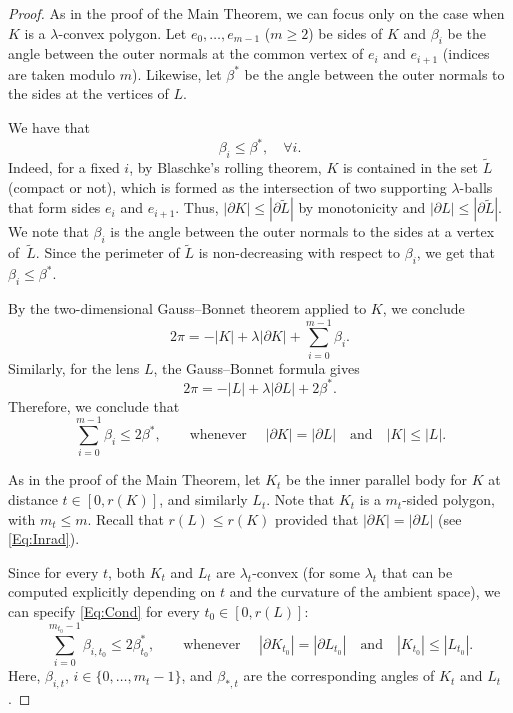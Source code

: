 \documentclass[10pt,a4paper]{amsart}
\renewcommand{\ge}{\geqslant}
\renewcommand{\le}{\leqslant}
\renewcommand{\tilde}{\widetilde}
\begin{document}
\begin{proof}
    As in the proof of the Main Theorem, we can focus only on the case when $K$ is a $\lambda$-convex polygon. Let $e_0, \ldots, e_{m-1}$ ($m \ge 2$) be sides of $K$ and $\beta_i$ be the angle between the outer normals at the common vertex of $e_i$ and $e_{i+1}$ (indices are taken modulo $m$).    
    Likewise, let $\beta^*$ be the angle between the outer normals to the sides at the vertices of $L$. 

   We have that 
    \begin{equation}
        \label{Eq:Angles}
        \beta_i \le \beta^*, \quad \forall i.
    \end{equation}
    Indeed, for a fixed $i$, by Blaschke's rolling theorem, $K$ is contained in the set $\tilde{L}$ (compact or not), which is formed as the intersection of two supporting $\lambda$-balls that form sides $e_i$ and $e_{i+1}$. Thus, $|\partial K| \le |\partial \tilde{L}|$ by monotonicity and $|\partial L| \le |\partial \tilde{L}|$. We note that $\beta_i$ is the angle between the outer normals to the sides at a vertex of~$\tilde{L}$. 
    Since the perimeter of $\tilde L$ is non-decreasing with respect to $\beta_i$, we get that $\beta_i \le \beta^*.$ 

    
    By the two-dimensional Gauss--Bonnet theorem applied to $K$, we conclude
    \begin{equation}\label{Eq:GB2}
    2\pi = -|K| + \lambda |\partial K| + \sum_{i=0}^{m-1} \beta_i.
    \end{equation}
    Similarly, for the lens $L$, the Gauss--Bonnet formula gives
    \[
    2\pi = -|L| + \lambda |\partial L| + 2 \beta^*.
    \]
    Therefore, we conclude that 
    \begin{equation}
        \label{Eq:Cond}
        \sum_{i=0}^{m-1} \beta_i \le 2\beta^*, \quad \quad \text{whenever }\quad |\partial K| = |\partial L| \quad \text{and} \quad |K| \le |L|. 
    \end{equation}    

As in the proof of the Main Theorem, let $K_t$ be the inner parallel body for $K$ at distance $t \in [0, r(K)]$, and similarly $L_t$. Note that $K_t$ is a $m_t$-sided polygon, with $m_t \le m$. Recall that $r(L) \le r(K)$ provided that $|\partial K| = |\partial L|$ (see \eqref{Eq:Inrad}).

Since for every $t$, both $K_t$ and $L_t$ are $\lambda_t$-convex (for some $\lambda_t$ that can be computed explicitly depending on $t$ and the curvature of the ambient space), we can specify \eqref{Eq:Cond} for every $t_0 \in [0,r(L)]$:
\begin{equation}
        \label{Eq:Cond2}
        \sum_{i=0}^{m_{t_0}-1} \beta_{i,t_0} \le 2\beta^*_{t_0}, \quad \quad \text{whenever }\quad |\partial K_{t_0}| = |\partial L_{t_0}| \quad \text{and} \quad |K_{t_0}| \le |L_{t_0}|. 
    \end{equation}    
Here, $\beta_{i,t}$, $i \in \{0, \ldots, m_t - 1\}$, and $\beta_{*,t}$ are the corresponding angles of $K_t$ and $L_t$.


\end{proof}
\end{document}

